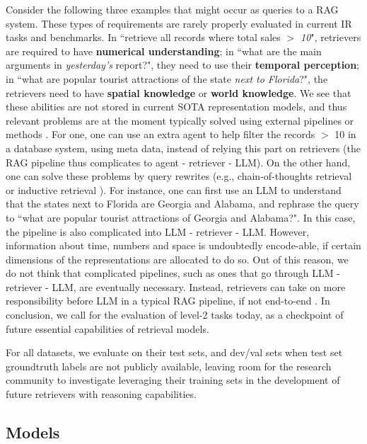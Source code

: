 \documentclass{article} %
\begin{document}
Consider the following three examples that might occur as queries to a RAG system. These types of requirements are rarely properly evaluated in current IR tasks and benchmarks. In ``retrieve all records where total sales \textit{$>$ 10}", retrievers are required to have \textbf{numerical understanding}; in ``what are the main arguments in \textit{yesterday's} report?", they need to use their \textbf{temporal perception}; in ``what are popular tourist attractions of the state \textit{next to Florida}?", the retrievers need to have \textbf{spatial knowledge} or \textbf{world knowledge}. We see that these abilities are not stored in current SOTA representation models, and thus relevant problems are at the moment typically solved using external pipelines or methods \citep{wang2023knowledgpt}. For one, one can use an extra agent to help filter the records $>$ 10 in a database system, using meta data, instead of relying this part on retrievers (the RAG pipeline thus complicates to agent - retriever - LLM). On the other hand, one can solve these problems by query rewrites \citep{ma2023query} (e.g., chain-of-thoughts retrieval \citep{yoran2023answering} or inductive retrieval \citep{zhang2023iag}). For instance, one can first use an LLM to understand that the states next to Florida are Georgia and Alabama, and rephrase the query to ``what are popular tourist attractions of Georgia and Alabama?". In this case, the pipeline is also complicated into LLM - retriever - LLM. However, information about time, numbers and space is undoubtedly encode-able, if certain dimensions of the representations are allocated to do so. Out of this reason, we do not think that complicated pipelines, such as ones that go through LLM - retriever - LLM, are eventually necessary. Instead, retrievers can take on more responsibility before LLM in a typical RAG pipeline, if not end-to-end \citep{asai2023self}. In conclusion, we call for the evaluation of level-2 tasks today, as a checkpoint of future essential capabilities of retrieval models.



For all datasets, we evaluate on their test sets, and dev/val sets when test set groundtruth labels are not publicly available, leaving room for the research community to investigate leveraging their training sets in the development of future retrievers with reasoning capabilities.

\subsection{Models}
\end{document}
